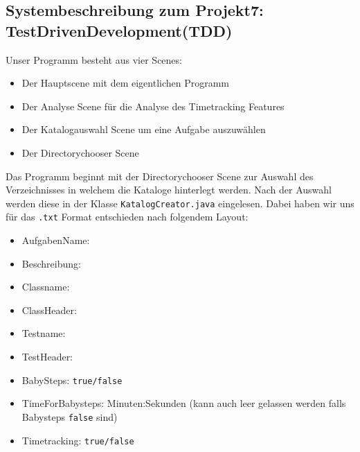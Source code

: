\documentclass[10pt]{article}
\begin{document}
\begin{center}

\section*{Systembeschreibung zum Projekt7: TestDrivenDevelopment(TDD)}

\end{center}
\bigskip
Unser Programm besteht aus vier Scenes:
\medskip
\begin{itemize}

\item Der Hauptscene mit dem eigentlichen Programm
\item Der Analyse Scene für die Analyse des Timetracking Features
\item Der Katalogauswahl Scene um eine Aufgabe auszuwählen
\item Der Directorychooser Scene

\end{itemize}
\medskip
Das Programm beginnt mit der Directorychooser Scene zur Auswahl des Verzeichnisses in welchem die Kataloge hinterlegt werden. Nach der Auswahl werden diese in der Klasse \verb+KatalogCreator.java+ eingelesen. Dabei haben wir uns für das \verb+.txt+ Format entschieden nach folgendem Layout:
\begin{itemize}

\item[] AufgabenName:

\item[] Beschreibung:

\item[] Classname:

\item[] ClassHeader:

\item[] Testname:

\item[] TestHeader:

\item[]BabySteps: \verb+true/false+
\item[] TimeForBabysteps: Minuten:Sekunden (kann auch leer gelassen werden falls Babysteps \verb+false+ sind)
\item[] Timetracking: \verb+true/false+
\end{itemize}
\medskip
\end{document}
